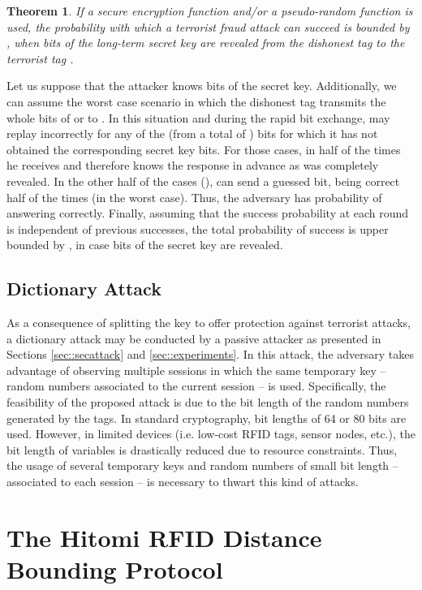 \documentclass{article}
\newtheorem{theorem}{Theorem}\newtheorem{proposition}[theorem]{Proposition}
\newenvironment{proof}[1][Proof]{\begin{trivlist}
\item[\hskip \labelsep {\bfseries #1}]}{\end{trivlist}}
\begin{document}
\begin{theorem}\label{th::terrorist}
If a secure encryption function and/or a pseudo-random function is used, the probability with which a terrorist fraud attack can succeed is bounded by , when  bits of the long-term secret key are revealed from the dishonest tag  to the terrorist tag .
\end{theorem}

\begin{proof}
Let us suppose that the attacker knows   bits of the secret key. Additionally, we can assume the worst case scenario in which the dishonest tag  transmits the whole  bits of  or  to . In this situation and during the rapid bit exchange,  may replay incorrectly  for any of the  (from a total of )  bits for which it has not obtained the corresponding secret key bits. For those cases,  in half of the times he receives  and therefore  knows the response in advance as  was completely revealed.  In the other half of the cases (),  can send a guessed bit, being correct half of the times (in the worst case). Thus, the adversary has  probability of answering correctly. Finally, assuming that the success probability at each round is independent of previous successes, the total probability of success is upper bounded by , in case  bits of the secret key are revealed. \end{proof}

\subsection{Dictionary Attack}
As a consequence of splitting the key to offer protection against terrorist attacks, a dictionary attack may be conducted by a passive attacker as presented in Sections \ref{sec::secattack} and \ref{sec::experiments}.  In this attack, the adversary takes advantage of observing multiple sessions in which the same temporary key -- random numbers associated to the current session -- is used.  Specifically, the feasibility of the proposed attack is due to the bit length of the random numbers generated by the tags.  In standard cryptography, bit lengths of 64 or 80 bits are used. However, in limited devices (i.e. low-cost RFID tags, sensor nodes, etc.), the bit length of variables is drastically reduced due to resource constraints. Thus, the usage of several temporary keys and random numbers of small bit length -- associated to each session -- is necessary to thwart this kind of attacks.


\section{The Hitomi RFID Distance Bounding Protocol}
\end{document}
